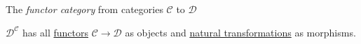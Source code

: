 The \emph{functor category} from categories $\mathcal{C}$ to $\mathcal{D}$

$\mathcal{D}^\mathcal{C}$ has all \href{doc/1 math/Seven Sketches in Compositionality/Chapter 3: Databases/3 Functors, natural transformations, and databases/2 Functors/1 Functor}{functors} $\mathcal{C} \rightarrow \mathcal{D}$ as objects and \href{doc/1 math/Seven Sketches in Compositionality/Chapter 3: Databases/3 Functors, natural transformations, and databases/4 Natural transformations/1 Natural transformation}{natural transformations} as morphisms.
